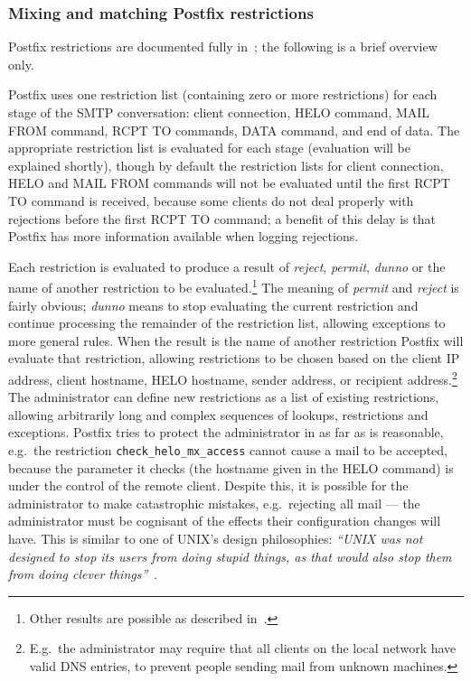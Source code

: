 \subsubsection{Mixing and matching Postfix restrictions}

\label{Mixing and matching Postfix restrictions}

Postfix restrictions are documented fully in~\cite{smtpd_access_readme,
smtpd_per_user_control, policy-servers}; the following is a brief overview
only.

Postfix uses one restriction list (containing zero or more restrictions)
for each stage of the \gls{SMTP} conversation: client connection, HELO
command, MAIL FROM command, RCPT TO commands, DATA command, and end of
data.  The appropriate restriction list is evaluated for each stage
(evaluation will be explained shortly), though by default the restriction
lists for client connection, HELO and MAIL FROM commands will not be
evaluated until the first RCPT TO command is received, because some clients
do not deal properly with rejections before the first RCPT TO command; a
benefit of this delay is that Postfix has more information available when
logging rejections.

Each restriction is evaluated to produce a result of \textit{reject},
\textit{permit}, \textit{dunno\/} or the name of another restriction to be
evaluated.\footnote{Other results are possible as described
in~\cite{smtpd_access_readme,smtpd_per_user_control,policy-servers}.} The
meaning of \textit{permit\/} and \textit{reject\/} is fairly obvious;
\textit{dunno\/} means to stop evaluating the current restriction and
continue processing the remainder of the restriction list, allowing
exceptions to more general rules.  When the result is the name of another
restriction Postfix will evaluate that restriction, allowing restrictions
to be chosen based on the client \gls{IP} address, client hostname, HELO
hostname, sender address, or recipient address.\footnote{E.g.\ the
administrator may require that all clients on the local network have valid
DNS entries, to prevent people sending mail from unknown machines.}  The
administrator can define new restrictions as a list of existing
restrictions, allowing arbitrarily long and complex sequences of lookups,
restrictions and exceptions.  Postfix tries to protect the administrator in
as far as is reasonable, e.g.\ the restriction
\texttt{check\_helo\_mx\_access} cannot cause a mail to be accepted,
because the parameter it checks (the hostname given in the HELO command) is
under the control of the remote client.  Despite this, it is possible for
the administrator to make catastrophic mistakes, e.g.\ rejecting all mail
--- the administrator must be cognisant of the effects their configuration
changes will have.  This is similar to one of UNIX's design philosophies:
\textit{``UNIX was not designed to stop its users from doing stupid things,
as that would also stop them from doing clever
things''\/}~\cite{unix-philosophy}.


